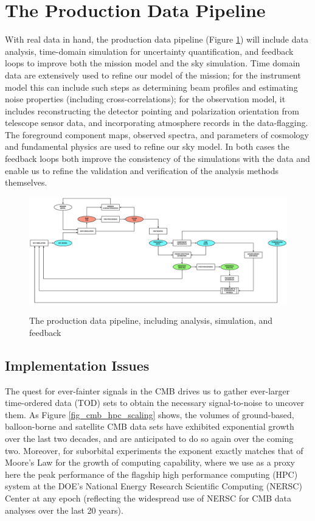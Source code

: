  
\section{The Production Data Pipeline}

With real data in hand, the production data pipeline (Figure \ref{fig_prod}) will include data analysis, time-domain simulation for uncertainty quantification, and feedback loops to improve both the mission model and the sky simulation. Time domain data are extensively used to refine our model of the mission; for the instrument model this can include such steps as determining beam profiles and estimating noise properties (including cross-correlations); for the observation model, it includes reconstructing the detector pointing and polarization orientation from telescope sensor data, and incorporating atmosphere records in the data-flagging. The foreground component maps, observed spectra, and parameters of cosmology and fundamental physics are used to refine our sky model. In both cases the feedback loops both improve the consistency of the simulations with the data and enable us to refine the validation and verification of the analysis methods themselves.

\begin{figure}[htbp]
\includegraphics[width=1.0\textwidth]{Analysis/production}\\
\caption{The production data pipeline, including analysis, simulation, and feedback}
\label{fig_prod}
\end{figure}

\subsection{Implementation Issues}

The quest for ever-fainter signals in the CMB drives us to gather ever-larger time-ordered data (TOD) sets to obtain the necessary signal-to-noise to uncover them. As Figure \ref{fig_cmb_hpc_scaling} shows, the volumes of ground-based, balloon-borne and satellite CMB data sets have exhibited exponential growth over the last two decades, and are anticipated to do so again over the coming two. Moreover, for suborbital experiments the exponent exactly matches that of Moore's Law for the growth of computing capability, where we use as a proxy here the peak performance of the flagship high performance computing (HPC) system at the DOE's National Energy Research Scientific Computing (NERSC) Center at any epoch (reflecting the widespread use of NERSC for CMB data analyses over the last 20 years). 

